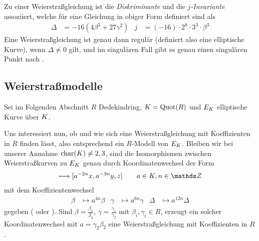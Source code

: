 Zu einer Weierstraßgleichung ist die \emph{Diskriminante} und die
\emph{$j$-Invariante} assoziiert, welche für eine Gleichung in obiger
Form definiert sind als 
\begin{align*}
  \Delta &= -16\left(4\beta^3 + 27\gamma^2\right)
  &j &= (-16)\cdot 2^8\cdot 3^3\cdot\beta^3
\end{align*}
Eine Weierstraßgleichung ist genau dann regulär (definiert also eine
elliptische Kurve), wenn $\Delta\neq 0$ gilt,
und im singulären Fall gibt es genau einen singulären Punkt
nach \cite[Proposition III.1.4]{silverman}.


\subsection{Weierstraßmodelle}
Sei im Folgenden Abschnitt $R$ Dedekindring,
$K=\operatorname{Quot}(R)$ und $E_{K}$ elliptische Kurve über $K$.

Uns interessiert nun, ob und wie sich eine Weierstraßgleichung mit
Koeffizienten in $R$ finden lässt, also entsprechend ein $R$-Modell
von $E_{K}$.
Bleiben wir bei unserer Annahme $\operatorname{char}(K)\neq2,3$, sind die
Isomorphismen zwischen Weierstraßkurven zu $E_{K}$ genau durch
Koordinatenwechsel der Form
\begin{gather*}
  [x,y,z] \longmapsto [a^{-2n}x, a^{-3n}y, z] \qquad a\in\K, n\in\Z
\end{gather*}
mit dem Koeffizientenwechsel
\begin{align*}
  \beta&\mapsto a^{4n}\beta
  &\gamma&\mapsto a^{6n}\gamma
  &\Delta&\mapsto a^{12n}\Delta
\end{align*}
gegeben
(\cite[1.5, Lemma 2]{neron} oder \cite[Chapter VII.1]{silverman}).
Sind $\beta=\frac{\beta_1}{\beta_2}$,
$\gamma=\frac{\gamma_1}{\gamma_2}$ mit $\beta_i,\gamma_i\in R$,
erzeugt ein solcher Koordinatenwechsel mit $a=\gamma_2\beta_2$ eine
Weierstraßgleichung mit Koeffizienten in $R$.

